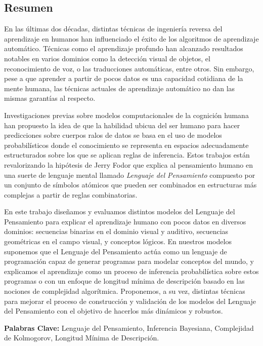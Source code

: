 
\rhead{}
\lhead{}
\renewcommand{\headrulewidth}{0pt}
\begin{center}
    \section*{Resumen}
\end{center}

En las últimas dos décadas, distintas técnicas de ingeniería reversa del aprendizaje en humanos han influenciado el éxito de los algoritmos de aprendizaje automático. Técnicas como el aprendizaje profundo han alcanzado resultados notables en varios dominios como la detección visual de objetos, el reconocimiento de voz, o las traducciones automáticas, entre otros. Sin embargo, pese a que aprender a partir de pocos datos es una capacidad cotidiana de la mente humana, las técnicas actuales de aprendizaje automático no dan las mismas garantías al respecto.

\medskip

Investigaciones previas sobre modelos computacionales de la cognición humana han propuesto la idea de que la habilidad ubicua del ser humano para hacer predicciones sobre cuerpos ralos de datos se basa en el uso de modelos probabilísticos donde el conocimiento se representa en espacios adecuadamente estructurados sobre los que se aplican reglas de inferencia. Estos trabajos están revalorizando la hipótesis de Jerry Fodor que explica al pensamiento humano en una suerte de lenguaje mental llamado {\em Lenguaje del Pensamiento} compuesto por un conjunto de símbolos atómicos que pueden ser combinados en estructuras más complejas a partir de reglas combinatorias.

\medskip

En este trabajo diseñamos y evaluamos distintos modelos del Lenguaje del Pensamiento para explicar el aprendizaje humano con pocos datos en diversos dominios: secuencias binarias en el dominio visual y auditivo, secuencias geométricas en el campo visual, y conceptos lógicos. En nuestros modelos suponemos que el Lenguaje del Pensamiento actúa como un lenguaje de programación capaz de generar programas para modelar conceptos del mundo, y explicamos el aprendizaje como un proceso de inferencia probabilística sobre estos programas o con un enfoque de longitud mínima de descripción basado en las nociones de complejidad algorítmica. Proponemos, a su vez, distintas técnicas para mejorar el proceso de construcción y validación de los modelos del Lenguaje del Pensamiento con el objetivo de hacerlos más dinámicos y robustos.
\vfill


\noindent\textbf{Palabras Clave:} Lenguaje del Pensamiento, Inferencia Bayesiana, Complejidad de Kolmogorov, Longitud Mínima de Descripción.